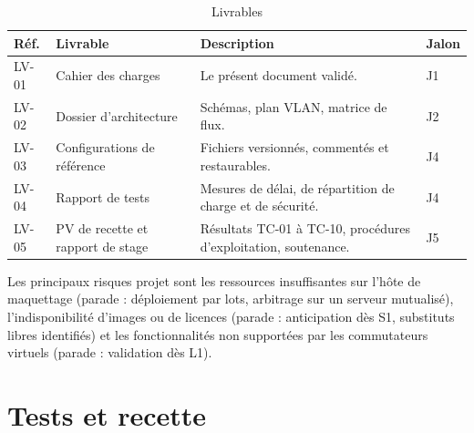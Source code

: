 \documentclass[11pt,a4paper]{article}
\begin{document}
\begin{table}[H]
\centering
\caption{Livrables}
\begin{tabularx}{\textwidth}{L{1.4cm} L{4.6cm} Y C{1.5cm}}
\toprule
{}\textbf{Réf.} & \textbf{Livrable} & \textbf{Description} & \textbf{Jalon} \\
\midrule
LV-01 & Cahier des charges & Le présent document validé. & J1 \\
LV-02 & Dossier d'architecture & Schémas, plan VLAN, matrice de flux. & J2 \\
LV-03 & Configurations de référence & Fichiers versionnés, commentés et restaurables. & J4 \\
LV-04 & Rapport de tests & Mesures de délai, de répartition de charge et de sécurité. & J4 \\
LV-05 & PV de recette et rapport de stage & Résultats TC-01 à TC-10, procédures d'exploitation, soutenance. & J5 \\
\bottomrule
\end{tabularx}
\end{table}

Les principaux risques projet sont les ressources insuffisantes sur l'hôte de maquettage (parade : déploiement par lots, arbitrage sur un serveur mutualisé), l'indisponibilité d'images ou de licences (parade : anticipation dès S1, substituts libres identifiés) et les fonctionnalités non supportées par les commutateurs virtuels (parade : validation dès L1).

\section{Tests et recette}
\end{document}
